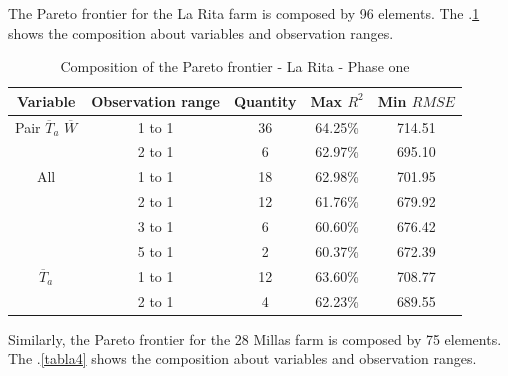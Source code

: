 The Pareto frontier for the La Rita farm is composed by 96 elements. The \tablename $.$\ref{tabla3} shows the composition about variables and observation ranges.

\begin{table}[h] 
\caption{Composition of the Pareto frontier - La Rita - Phase one} 
\label{tabla3} 
\centering
\begin{tabular}{c|c|c|c|c} 
\hline
\bfseries Variable & \bfseries Observation range & \bfseries Quantity & \bfseries Max $R^2$ & \bfseries Min $RMSE$\\ 
\hline\hline 
Pair $\overline{T}_{a}$ $\overline{W}$ &	1 to 1  & 36 & 64.25\% & 714.51 \\
 &	2 to 1  & 6 & 62.97\% & 695.10 \\
\hline 
All  & 1 to 1  & 18 & 62.98\% & 701.95 \\
   & 2 to 1  & 12 & 61.76\% & 679.92 \\
    & 3 to 1  & 6 & 60.60\% & 676.42 \\
    & 5 to 1  &  2 & 60.37\% & 672.39 \\
\hline    
$\overline{T}_{a}$ & 1 to 1  & 12  & 63.60\% & 708.77 \\
       &	2 to 1  & 4 & 62.23\% & 689.55 \\
\hline
\end{tabular} 
\end{table}

Similarly, the Pareto frontier for the 28 Millas farm is composed by 75 elements. The \tablename $.$\ref{tabla4} shows the composition about variables and observation ranges.

